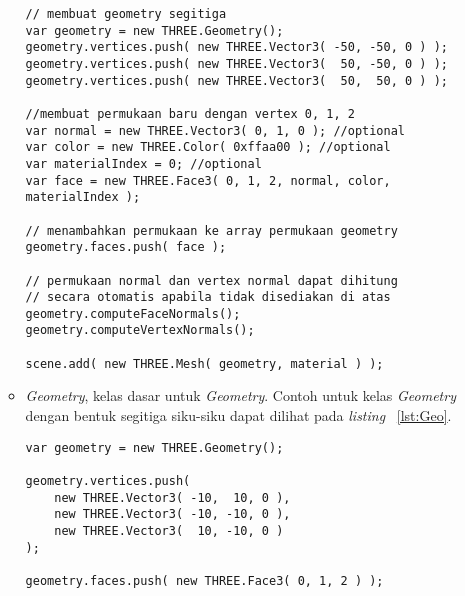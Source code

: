 \begin{itemize}
\begin{itemize}
\begin{lstlisting}[caption={Contoh penggunaan {\it Face3} pada suatu {\it Geometry}.}, label={lst:face3},captionpos=b]
// membuat geometry segitiga
var geometry = new THREE.Geometry();
geometry.vertices.push( new THREE.Vector3( -50, -50, 0 ) );
geometry.vertices.push( new THREE.Vector3(  50, -50, 0 ) );
geometry.vertices.push( new THREE.Vector3(  50,  50, 0 ) );

//membuat permukaan baru dengan vertex 0, 1, 2
var normal = new THREE.Vector3( 0, 1, 0 ); //optional
var color = new THREE.Color( 0xffaa00 ); //optional
var materialIndex = 0; //optional
var face = new THREE.Face3( 0, 1, 2, normal, color, materialIndex );

// menambahkan permukaan ke array permukaan geometry
geometry.faces.push( face );

// permukaan normal dan vertex normal dapat dihitung
// secara otomatis apabila tidak disediakan di atas
geometry.computeFaceNormals();
geometry.computeVertexNormals();

scene.add( new THREE.Mesh( geometry, material ) );
\end{lstlisting}
		\item{\it Geometry}, kelas dasar untuk {\it Geometry}. Contoh untuk kelas {\it Geometry} dengan bentuk segitiga siku-siku dapat dilihat pada {\it listing} ~\ref{lst:Geo}.
\begin{lstlisting}[caption={Contoh instansiasi kelas {\it Geometry}.}, label={lst:Geo},captionpos=b]
var geometry = new THREE.Geometry();

geometry.vertices.push(
	new THREE.Vector3( -10,  10, 0 ),
	new THREE.Vector3( -10, -10, 0 ),
	new THREE.Vector3(  10, -10, 0 )
);

geometry.faces.push( new THREE.Face3( 0, 1, 2 ) );


\end{lstlisting}
\end{itemize}
\end{itemize}
